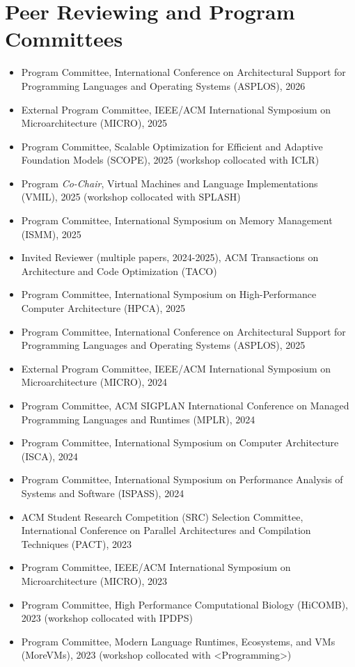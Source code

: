 \documentclass[singlecolumn,singlespace,11pt]{article}
\begin{document}
\section*{Peer Reviewing and Program Committees}
\begin{itemize}
\item Program Committee, International Conference on Architectural Support for Programming Languages and Operating Systems (ASPLOS), 2026
\item External Program Committee, IEEE/ACM International Symposium on Microarchitecture (MICRO), 2025
\item Program Committee, Scalable Optimization for Efficient and Adaptive Foundation Models (SCOPE), 2025 (workshop collocated with ICLR)
\item Program \textit{Co-Chair}, Virtual Machines and Language Implementations (VMIL), 2025 (workshop collocated with SPLASH)
\item Program Committee, International Symposium on Memory Management (ISMM), 2025
\item Invited Reviewer (multiple papers, 2024-2025), ACM Transactions on Architecture and Code Optimization (TACO)
\item Program Committee, International Symposium on High-Performance Computer Architecture (HPCA), 2025
\item Program Committee, International Conference on Architectural Support for Programming Languages and Operating Systems (ASPLOS), 2025
\item External Program Committee, IEEE/ACM International Symposium on Microarchitecture (MICRO), 2024
\item Program Committee, ACM SIGPLAN International Conference on Managed Programming Languages and Runtimes (MPLR), 2024
\item Program Committee, International Symposium on Computer Architecture (ISCA), 2024
\item Program Committee, International Symposium on Performance Analysis of Systems and Software (ISPASS), 2024
\item ACM Student Research Competition (SRC) Selection Committee, International Conference on Parallel Architectures and Compilation Techniques (PACT), 2023
\item Program Committee, IEEE/ACM International Symposium on Microarchitecture (MICRO), 2023
\item Program Committee, High Performance Computational Biology (HiCOMB), 2023 (workshop collocated with IPDPS)
\item Program Committee, Modern Language Runtimes, Ecosystems, and VMs (MoreVMs), 2023 (workshop collocated with <Programming>) 

\end{itemize}
\end{document}

